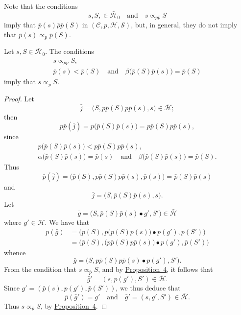 \documentclass[a4paper,fleqn]{article}
\theoremstyle{plain}
\newenvironment{proposition}[1]
  {\renewcommand\theinnerproposition{#1}\innerproposition}
  {\endinnerproposition}
\theoremstyle{definition}
\newcommand{\textand}{\quad\text{and}\quad}
\newcommand{\CC}{\mathcal{C}}
\newcommand{\HH}{\mathcal{H}}
\newcommand{\bHH}{\bar{\HH}}
\renewcommand{\SS}{\mathcal{S}}
\newcommand{\relrhobar}{\mathrel{\bar{\rho}}}
\newcommand{\subs}{\mathrel{\propto}}
\begin{document}
Note that the conditions
\[
  s,S,\in\bHH_0
  \textand
  s\subs_{p\bar{p}} S
\]
imply that $\bar{p}(s)\relrhobar\bar{p}(S)$ in $(\CC,p,\HH,\SS)$, but, in general, they do not imply that $\bar{p}(s)\subs_p\bar{p}(S)$.

\begin{proposition}{12}
\label{proposition:i-12}
  Let $s,S\in\bHH_0$.
  The conditions
  \[
    \begin{gathered}
      s\subs_{p\bar{p}}S,
    \\\bar{p}(s)<\bar{p}(S)
      \textand
      \beta\big(\bar{p}(S)\bar{p}(s)\big) = \bar{p}(S)
    \end{gathered}
  \]
  imply that $s\subs_{\bar{p}}S$.
\end{proposition}

\begin{proof}
  Let
  \[
    \bar{j}
    = \big(
      S, p\bar{p}(S)p\bar{p}(s), s
    \big) \in \bHH;
  \]
  then
  \[
    p\bar{p}(\bar{j})
    = p\big(
      \bar{p}(S)\bar{p}(s)
    \big)
    = p\bar{p}(S)p\bar{p}(s),
  \]
  since
  \[
    \begin{gathered}
      p\big(
        \bar{p}(S)\bar{p}(s)
      \big) < p\bar{p}(S)p\bar{p}(s),
    \\\alpha\big(
        \bar{p}(S)\bar{p}(s)
      \big) = \bar{p}(s)
      \textand
      \beta\big(
        \bar{p}(S)\bar{p}(s)
      \big) = \bar{p}(S).
    \end{gathered}
  \]
  Thus
  \[
    \bar{p}(\bar{j})
    = \big(
      \bar{p}(S), p\bar{p}(S)p\bar{p}(s), \bar{p}(s)
    \big)
    = \bar{p}(S)\bar{p}(s)
  \]
  and
  \[
    \bar{j}
    =\big(
      S, \bar{p}(S)\bar{p}(s), s
    \big).
  \]
  Let
  \[
    \bar{g}
    = \big(
      S, \bar{p}(S)\bar{p}(s)\bullet g', S'
    \big) \in\bHH
  \]
  where $g'\in\HH$.
  We have that
  \[
    \begin{aligned}
      \bar{p}(\bar{g})
      &= \big(
        \bar{p}(S),
        p\big(\bar{p}(S)\bar{p}(s)\big)\bullet p(g'),
        \bar{p}(S')
      \big)
    \\&= \big(
        \bar{p}(S),
        \big(p\bar{p}(S)p\bar{p}(s)\big)\bullet p(g'),
        \bar{p}(S')
      \big)
    \end{aligned}
  \]
  whence
  \[
    \bar{g}
    = \big(
      S, p\bar{p}(S)p\bar{p}(s)\bullet p(g'), S'
    \big).
  \]
  From the condition that $s\subs_{\bar{p}}S$, and by \hyperref[proposition:i-4]{Proposition~4}, it follows that
  \[
    \bar{g}'
    = (s, p(g'), S')
    \in\bHH.
  \]
  Since $g'=(\bar{p}(s),p(g'),\bar{p}(S'))$, we thus deduce that
  \[
    \bar{p}(\bar{g}') = g'
    \textand
    \bar{g}' = (s,g',S') \in \bHH.
  \]
  Thus $s\subs_{\bar{p}}S$, by \hyperref[proposition:i-4]{Proposition~4}.
\end{proof}
\end{document}
